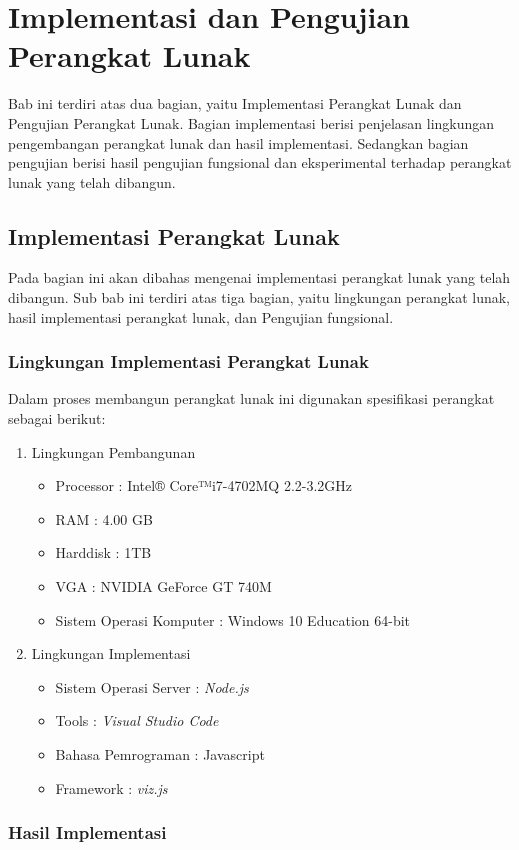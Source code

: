 \chapter{Implementasi dan Pengujian Perangkat Lunak}
\label{chap: Implementasi dan Pengujian Perangkat Lunak}

Bab ini terdiri atas dua bagian, yaitu Implementasi Perangkat Lunak dan Pengujian Perangkat Lunak. Bagian implementasi berisi penjelasan lingkungan pengembangan perangkat lunak dan hasil implementasi. Sedangkan bagian pengujian berisi hasil pengujian fungsional dan eksperimental terhadap perangkat lunak yang telah dibangun.

\section{Implementasi Perangkat Lunak}
\label{sec: Implementasi Perangkat Lunak}

Pada bagian ini akan dibahas mengenai implementasi perangkat lunak yang telah dibangun. Sub bab ini terdiri atas tiga bagian, yaitu lingkungan perangkat lunak, hasil implementasi perangkat lunak, dan Pengujian fungsional.

\subsection{Lingkungan Implementasi Perangkat Lunak}
\label{sec: Lingkungan Implementasi Perangkat Lunak}

Dalam proses membangun perangkat lunak ini digunakan spesifikasi perangkat sebagai berikut:

\begin{enumerate}
\item Lingkungan Pembangunan \\
\begin{itemize}
\item Processor : Intel® Core™i7-4702MQ 2.2-3.2GHz
\item RAM : 4.00 GB
\item Harddisk : 1TB
\item VGA : NVIDIA GeForce GT 740M
\item Sistem Operasi Komputer : Windows 10 Education 64-bit
\end{itemize}

\item Lingkungan Implementasi
\begin{itemize}
\item Sistem Operasi Server : \textit{Node.js}
\item Tools : \textit{Visual Studio Code}
\item Bahasa Pemrograman : Javascript
\item Framework : \textit{viz.js}
\end{itemize}

\end{enumerate}

\subsection{Hasil Implementasi}
\label{sec: Hasil Implementasi}

